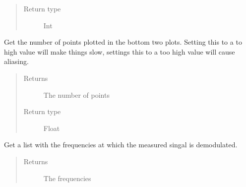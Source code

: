 \documentclass[letterpaper,10pt,english]{sphinxmanual}
\begin{document}
\begin{fulllineitems}
\begin{fulllineitems}
\begin{quote}
\begin{description}
\item[{Return type}] \leavevmode
\sphinxAtStartPar
Int

\end{description}\end{quote}

\end{fulllineitems}


\begin{fulllineitems}
\label{\detokenize{index:TiePieLCR_settings.TiePieLCR_settings.get_demodulate_plot_points}}
\sphinxAtStartPar
Get the number of points plotted in the bottom two plots. Setting this to a to high value will make things slow, settings this to a too high value will cause aliasing.
\begin{quote}\begin{description}
\item[{Returns}] \leavevmode
\sphinxAtStartPar
The number of points

\item[{Return type}] \leavevmode
\sphinxAtStartPar
Float

\end{description}\end{quote}

\end{fulllineitems}


\begin{fulllineitems}
\label{\detokenize{index:TiePieLCR_settings.TiePieLCR_settings.get_demodulation_bandwidth}}
\end{fulllineitems}


\begin{fulllineitems}
\label{\detokenize{index:TiePieLCR_settings.TiePieLCR_settings.get_demodulation_freqs}}
\sphinxAtStartPar
Get a list with the frequencies at which the measured singal is demodulated.
\begin{quote}\begin{description}
\item[{Returns}] \leavevmode
\sphinxAtStartPar
The frequencies


\end{description}
\end{quote}
\end{fulllineitems}
\end{fulllineitems}
\end{document}
